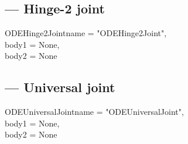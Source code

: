 \subsection{ --- Hinge-2 joint}

\begin{classdesc}{ODEHinge2Joint}{name = "ODEHinge2Joint",\\ 
                             body1 = None, \\
                             body2 = None
                             }

\end{classdesc}

\subsection{ --- Universal joint}

\begin{classdesc}{ODEUniversalJoint}{name = "ODEUniversalJoint",\\ 
                             body1 = None, \\
                             body2 = None
                             }

\end{classdesc}




